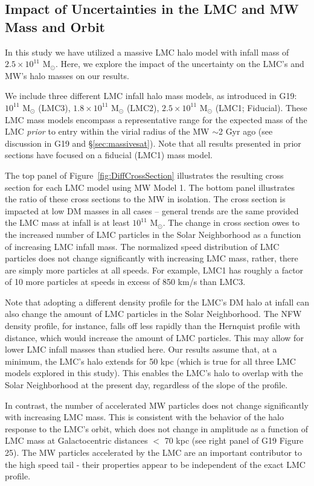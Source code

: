 \documentclass[letterpaper,11pt]{article}
\begin{document}
\subsection{Impact of Uncertainties in the LMC and MW Mass and Orbit}
\label{sec:LMCMass}

In this study we have utilized a massive LMC halo model with infall mass of $2.5\times10^{11}$ M$_\odot$. Here, we explore the impact of the uncertainty on the LMC's and MW's halo masses on our results.

We include three different LMC infall halo mass models, as introduced in G19:  $10^{11}$ M$_\odot$ (LMC3), $1.8\times 10^{11}$ M$_\odot$ (LMC2), $2.5\times 10^{11}$ M$_\odot$ (LMC1; Fiducial). These LMC mass models encompass a representative range for the expected mass of the LMC {\it prior} to entry within the virial radius of the MW $\sim$2 Gyr ago (see discussion in G19 and \S\ref{sec:massivesat}).  Note that all results presented in prior sections have focused on a fiducial (LMC1) mass model. 

The top panel of Figure~\ref{fig:DiffCrossSection} illustrates the resulting cross section for each LMC model using MW Model 1. The bottom panel illustrates the ratio of these cross sections to the MW in isolation.  The cross section is impacted at low DM masses in all cases -- general trends are the same provided the LMC mass at infall is at least $10^{11}$ M$_\odot$.  The change in cross section owes to the increased
 number of LMC particles in the 
Solar Neighborhood as a function of increasing LMC infall mass.  The normalized speed distribution of LMC particles does not change significantly with increasing LMC mass, rather, there are simply more particles at all speeds. 
For example, LMC1 has roughly a factor of 10 more particles at speeds in excess of 850 km/s than LMC3. 

Note that adopting a different density profile for the LMC's DM halo at infall can also change the amount of LMC 
particles in the Solar Neighborhood. The NFW density profile, for instance, falls off less rapidly than the Hernquist profile with distance, which would increase the amount of LMC particles. This may allow for lower LMC infall masses than studied here. Our results assume that, at a minimum, the LMC's halo extends for 50 kpc (which is true for all three LMC models explored in this study). This enables the LMC's halo to overlap with the Solar Neighborhood at the present day, regardless of the 
slope of the profile. 

In contrast, the number of accelerated MW particles does not change significantly with increasing LMC mass.
This is consistent with the behavior of the halo response to the LMC's orbit, which does not change in amplitude 
as a function of LMC mass at Galactocentric distances $<$ 70 kpc (see right panel of G19 Figure 25). 
The MW particles accelerated by the LMC are an important contributor to the high speed tail - their properties appear to be independent of the exact LMC profile. 
\end{document}
